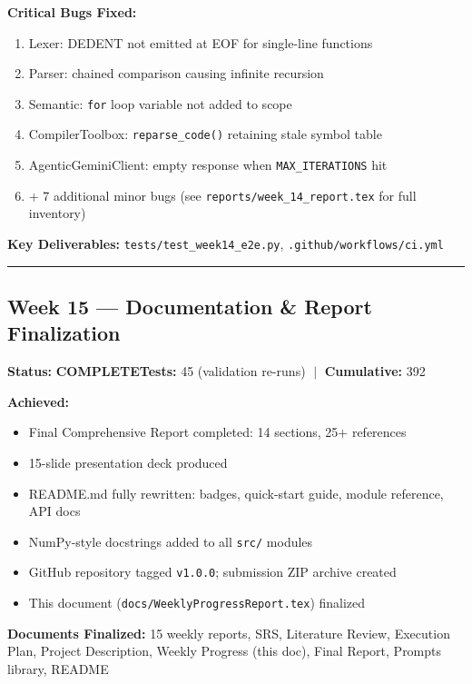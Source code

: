 \documentclass[a4paper,11pt]{article}
\newcommand{\done}{\colorbox{green!25}{\textbf{\small COMPLETE}}}
\begin{document}
\textbf{Critical Bugs Fixed:}
\begin{enumerate}[leftmargin=*, itemsep=1pt]
    \item Lexer: DEDENT not emitted at EOF for single-line functions
    \item Parser: chained comparison causing infinite recursion
    \item Semantic: \texttt{for} loop variable not added to scope
    \item CompilerToolbox: \texttt{reparse\_code()} retaining stale symbol table
    \item AgenticGeminiClient: empty response when \texttt{MAX\_ITERATIONS} hit
    \item + 7 additional minor bugs (see \texttt{reports/week\_14\_report.tex} for full inventory)
\end{enumerate}

\textbf{Key Deliverables:} \texttt{tests/test\_week14\_e2e.py}, \texttt{.github/workflows/ci.yml}

\vspace{4pt}\hrule\vspace{6pt}

\subsection{Week 15 --- Documentation \& Report Finalization}

\textbf{Status:} \done \hfill \textbf{Tests:} 45 (validation re-runs) $\;|\;$ \textbf{Cumulative:} 392

\textbf{Achieved:}
\begin{itemize}[leftmargin=*, itemsep=1pt]
    \item Final Comprehensive Report completed: 14 sections, 25+ references
    \item 15-slide presentation deck produced
    \item README.md fully rewritten: badges, quick-start guide, module reference, API docs
    \item NumPy-style docstrings added to all \texttt{src/} modules
    \item GitHub repository tagged \texttt{v1.0.0}; submission ZIP archive created
    \item This document (\texttt{docs/WeeklyProgressReport.tex}) finalized
\end{itemize}

\textbf{Documents Finalized:} 15 weekly reports, SRS, Literature Review, Execution Plan, Project Description, Weekly Progress (this doc), Final Report, Prompts library, README
\end{document}
